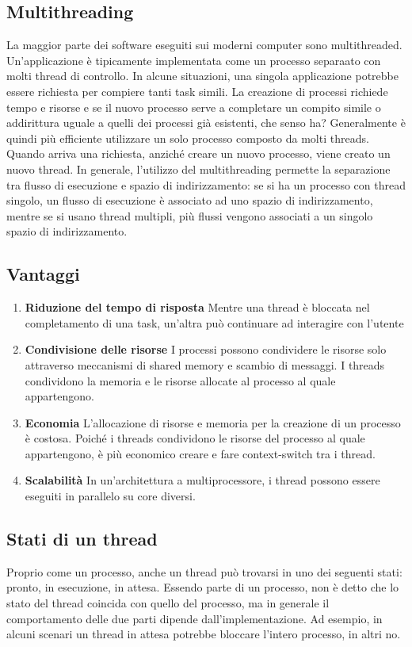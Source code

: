 \documentclass[a4paper]{article}
\begin{document}
\subsection{Multithreading}
La maggior parte dei software eseguiti sui moderni computer sono multithreaded. Un'applicazione è tipicamente implementata come un processo separaato con molti thread di controllo. In alcune situazioni, una singola applicazione potrebbe essere richiesta per compiere tanti task simili. La creazione di processi richiede tempo e risorse e se il nuovo processo serve a completare un compito simile o addirittura uguale a quelli dei processi già esistenti, che senso ha? Generalmente è quindi più efficiente utilizzare un solo processo composto da molti threads. Quando arriva una richiesta, anziché creare un nuovo processo, viene creato un nuovo thread. In generale, l'utilizzo del multithreading permette la separazione tra flusso di esecuzione e spazio di indirizzamento: se si ha un processo con thread singolo, un flusso di esecuzione è associato ad uno spazio di indirizzamento, mentre se si usano thread multipli, più flussi vengono associati a un singolo spazio di indirizzamento.

\subsection{Vantaggi}
\begin{enumerate}
    \item \textbf{Riduzione del tempo di risposta} Mentre una thread è bloccata nel completamento di una task, un'altra può continuare ad interagire con l'utente
    \item \textbf{Condivisione delle risorse} I processi possono condividere le risorse solo attraverso meccanismi di shared memory e scambio di messaggi. I threads condividono la memoria e le risorse allocate al processo al quale appartengono.
    \item \textbf{Economia} L'allocazione di risorse e memoria per la creazione di un processo è costosa. Poiché i threads condividono le risorse del processo al quale appartengono, è più economico creare e fare context-switch tra i thread.
    \item \textbf{Scalabilità} In un'architettura a multiprocessore, i thread possono essere eseguiti in parallelo su core diversi.
\end{enumerate}

\subsection{Stati di un thread}
Proprio come un processo, anche un thread può trovarsi in uno dei seguenti stati: pronto, in esecuzione, in attesa. Essendo parte di un processo, non è detto che lo stato del thread coincida con quello del processo, ma in generale il comportamento delle due parti dipende dall'implementazione. Ad esempio, in alcuni scenari un thread in attesa potrebbe bloccare l'intero processo, in altri no.
\end{document}
